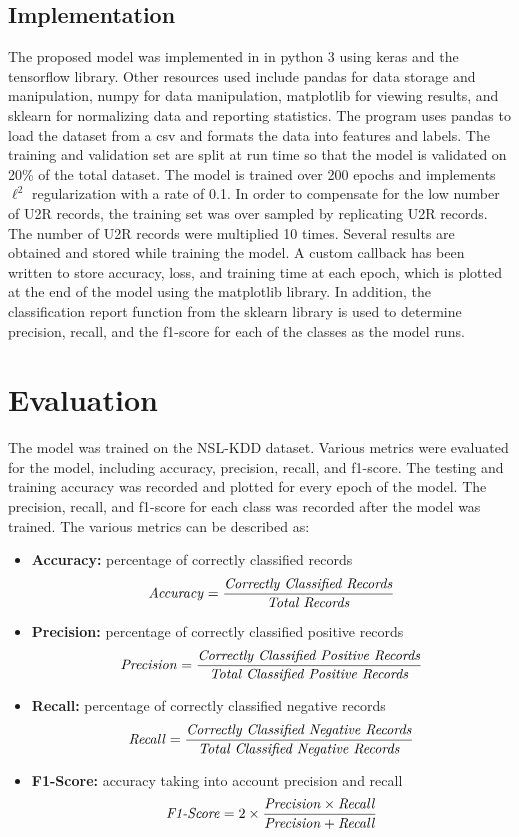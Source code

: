 \documentclass{article}
\begin{document}
\subsection{Implementation}

The proposed model was implemented in in python 3 using keras and the tensorflow library. Other resources used include pandas for data storage and manipulation, numpy for data manipulation, matplotlib for viewing results, and sklearn for normalizing data and reporting statistics. The program uses pandas to load the dataset from a csv and formats the data into features and labels. The training and validation set are split at run time so that the model is validated on 20\% of the total dataset. The model is trained over 200 epochs and implements $\ell^2$ regularization with a rate of 0.1. In order to compensate for the low number of U2R records, the training set was over sampled by replicating U2R records. The number of U2R records were multiplied 10 times. Several results are obtained and stored while training the model. A custom callback has been written to store accuracy, loss, and training time at each epoch, which is plotted at the end of the model using the matplotlib library. In addition, the classification report function from the sklearn library is used to determine precision, recall, and the f1-score for each of the classes as the model runs.

\section{Evaluation}

The model was trained on the NSL-KDD dataset. Various metrics were evaluated for the model, including accuracy, precision, recall, and f1-score. The testing and training accuracy was recorded and plotted for every epoch of the model. The precision, recall, and f1-score for each class was recorded after the model was trained. The various metrics can be described as:

\begin{itemize}
  \item \textbf{Accuracy:} percentage of correctly classified records
  \[\text{\textit{Accuracy}} = \frac{\text{\textit{Correctly Classified Records}}}{\text{\textit{Total Records}}} \]
  \item \textbf{Precision:} percentage of correctly classified positive records
  \[\text{\textit{Precision}} = \frac{\text{\textit{Correctly Classified Positive Records}}}{\text{\textit{Total Classified Positive Records}}} \]
  \item \textbf{Recall:} percentage of correctly classified negative records
  \[\text{\textit{Recall}} = \frac{\text{\textit{Correctly Classified Negative Records}}}{\text{\textit{Total Classified Negative Records}}} \]
  \item \textbf{F1-Score:} accuracy taking into account precision and recall
  \[\text{\textit{F1-Score}} = 2 \times \frac{\text{\textit{Precision}} \times \text{\textit{Recall}}}{\text{\textit{Precision}} + \text{\textit{Recall}}} \]
\end{itemize}
\end{document}
